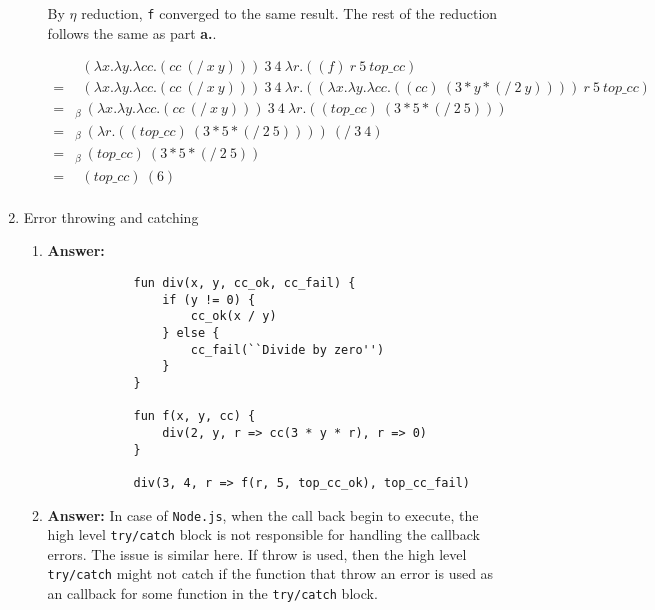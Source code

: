 \documentclass{article}
\begin{document}
\begin{enumerate}
\begin{enumerate}
			By $\eta$ reduction, \texttt{f} converged to the same result. The rest of
			the reduction follows the same as part \textbf{a.}.

			\begin{align*}
			&\ \ (\lambda x.\lambda y. \lambda cc.(cc\ (/\ x\ y)))\ 3\ 4\ \lambda r.((f)\
			r\ 5\ top\_cc)\\
			=&\ \ (\lambda x.\lambda y. \lambda cc.(cc\ (/\ x\ y)))\ 3\ 4\ \lambda
			r.((\lambda x.\lambda y. \lambda cc.((cc)\ (3*y*(/\ 2\ y))))\ r\ 5\ top\_cc)\\
			=&_{\beta}\ (\lambda x.\lambda y. \lambda cc.(cc\ (/\ x\ y)))\ 3\ 4\ \lambda
			r.((top\_cc)\ (3*5*(/\ 2\ 5)))\\
			=&_{\beta}\ (\lambda r.((top\_cc)\ (3*5*(/\ 2\ 5))))\ (/\ 3\ 4)\\
			=&_{\beta}\ (top\_cc)\ (3*5*(/\ 2\ 5))\\
			=&\ \ (top\_cc)\ (6)\\
			\end{align*}

		\end{enumerate}

	\item Error throwing and catching
	\begin{enumerate}
		\item \textbf{Answer:}
		\begin{lstlisting}
			fun div(x, y, cc_ok, cc_fail) {
				if (y != 0) {
					cc_ok(x / y)
				} else {
					cc_fail(``Divide by zero'')
				}
			}

			fun f(x, y, cc) {
				div(2, y, r => cc(3 * y * r), r => 0)
			}
			
			div(3, 4, r => f(r, 5, top_cc_ok), top_cc_fail)
		\end{lstlisting}

		\item \textbf{Answer:} In case of \texttt{Node.js}, when the call back begin
			to execute, the high level \texttt{try/catch} block is not responsible for
			handling the callback errors. The issue is similar here. If throw is used,
			then the high level \texttt{try/catch} might not catch if the function
			that throw an error is used as an callback for some function in the
			\texttt{try/catch} block.

	\end{enumerate}
\end{enumerate}
\end{document}
